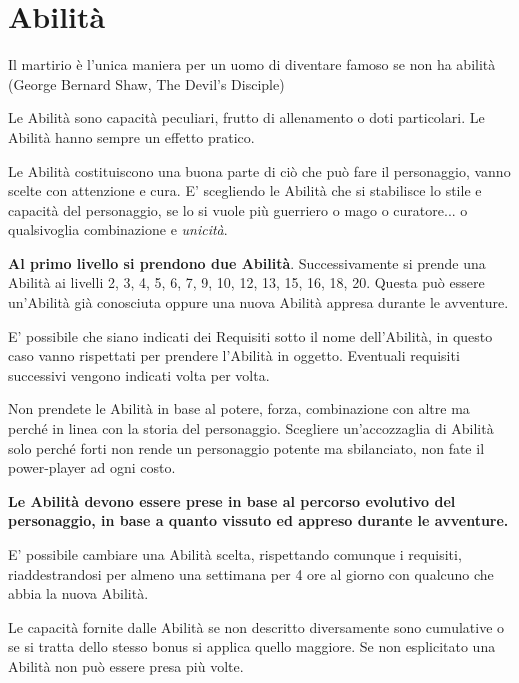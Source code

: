 \section{Abilità}\hypertarget{abilita}{}\label{abilita}

\begin{enfasi}{Il martirio è l'unica maniera per un uomo di diventare famoso se non ha abilità (George Bernard Shaw, The Devil's Disciple)} \end{enfasi}

\begin{multicols}{2}

Le Abilità sono capacità peculiari, frutto di allenamento o doti particolari. Le Abilità hanno sempre un effetto pratico.

Le Abilità costituiscono una buona parte di ciò che può fare il personaggio, vanno scelte con attenzione e cura. E' scegliendo le Abilità che si stabilisce lo stile e capacità del personaggio, se lo si vuole più guerriero o mago o curatore... o qualsivoglia combinazione e \emph{unicità}.

\textbf{Al primo livello si prendono due Abilità}. Successivamente si prende una Abilità ai livelli 2, 3, 4, 5, 6, 7, 9, 10, 12, 13, 15, 16, 18, 20. Questa può essere un'Abilità già conosciuta oppure una nuova Abilità appresa durante le avventure.

E' possibile che siano indicati dei Requisiti sotto il nome dell'Abilità, in questo caso vanno rispettati per prendere l'Abilità in oggetto.
Eventuali requisiti successivi vengono indicati volta per volta.

Non prendete le Abilità in base al potere, forza, combinazione con altre ma perché in linea con la storia del personaggio.
Scegliere un'accozzaglia di Abilità solo perché forti non rende un personaggio potente ma sbilanciato, non fate il power-player ad ogni costo.

\medskip

\textbf{Le Abilità devono essere prese in base al percorso evolutivo del personaggio, in base a quanto vissuto ed appreso durante le avventure.}

\medskip

E' possibile cambiare una Abilità scelta, rispettando comunque i requisiti, riaddestrandosi per almeno una settimana per 4 ore al giorno con qualcuno che abbia la nuova Abilità.

Le capacità fornite dalle Abilità se non descritto diversamente sono cumulative o se si tratta dello stesso bonus si applica quello maggiore. Se non esplicitato una Abilità non può essere presa più volte.


\end{multicols}
